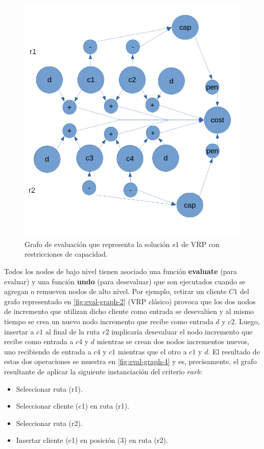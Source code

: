  \begin{figure}
	\centering
	\includegraphics[width=0.9\linewidth]{Graphics/eval-graph-3}
	\caption{Grafo de evaluación que representa la solución $s1$ de VRP con restricciones de capacidad.}
	\label{fig:eval-graph-3}
\end{figure}

Todos los nodos de bajo nivel tienen asociado una función \textbf{evaluate} (para evaluar) y una función \textbf{undo} (para desevaluar) que son ejecutados cuando se agregan o remueven nodos de alto nivel. Por ejemplo, retirar un cliente $C1$ del grafo representado en \ref{fig:eval-graph-2} (VRP clásico) provoca que los dos nodos de incremento que utilizan dicho cliente como entrada se desevalúen y al mismo tiempo se crea un nuevo nodo incremento que recibe como entrada $d$ y $c2$. Luego, insertar a $c1$ al final de la ruta $r2$ implicaría desevaluar el nodo incremento que recibe como entrada a $c4$ y $d$ mientras se crean dos nodos incrementos nuevos, uno recibiendo de entrada a $c4$ y $c1$ mientras que el otro a $c1$ y $d$. El resultado de estas dos operaciones se muestra en \ref{fig:eval-graph-4} y es, precisamente, el grafo resultante de aplicar la siguiente instanciación del criterio $rarb$:

\begin{itemize}
	\item Seleccionar ruta (r1).
	\item Seleccionar cliente (c1) en ruta (r1).
	\item Seleccionar ruta (r2).
	\item Insertar cliente (c1) en posición (3) en ruta (r2).
\end{itemize}

